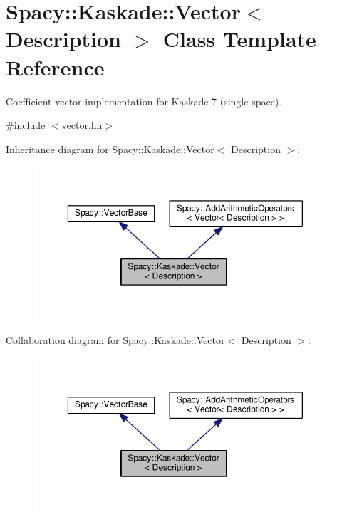 \hypertarget{classSpacy_1_1Kaskade_1_1Vector}{\section{Spacy\-:\-:Kaskade\-:\-:Vector$<$ Description $>$ Class Template Reference}
\label{classSpacy_1_1Kaskade_1_1Vector}
}


Coefficient vector implementation for Kaskade 7 (single space).  




{\ttfamily \#include $<$vector.\-hh$>$}



Inheritance diagram for Spacy\-:\-:Kaskade\-:\-:Vector$<$ Description $>$\-:
\nopagebreak
\begin{figure}[H]
\begin{center}
\leavevmode
\includegraphics[width=350pt]{classSpacy_1_1Kaskade_1_1Vector__inherit__graph}
\end{center}
\end{figure}


Collaboration diagram for Spacy\-:\-:Kaskade\-:\-:Vector$<$ Description $>$\-:
\nopagebreak
\begin{figure}[H]
\begin{center}
\leavevmode
\includegraphics[width=350pt]{classSpacy_1_1Kaskade_1_1Vector__coll__graph}
\end{center}
\end{figure}
